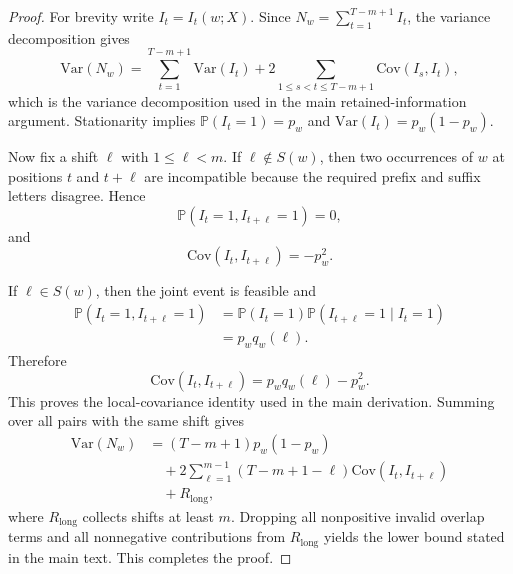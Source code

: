 \documentclass[12pt,letterpaper]{article}
\begin{document}
\begin{proof}
For brevity write $I_t=I_t(w;X)$. Since $N_w=\sum_{t=1}^{T-m+1} I_t$, the variance decomposition gives
\begin{equation}
\mathrm{Var}(N_w)
=
\sum_{t=1}^{T-m+1}\mathrm{Var}(I_t)
+
2\sum_{1\leq s<t\leq T-m+1}\mathrm{Cov}(I_s,I_t),
\label{eq:appvardecomp}
\end{equation}
which is the variance decomposition used in the main retained-information argument. Stationarity implies $\mathbb{P}(I_t=1)=p_w$ and $\mathrm{Var}(I_t)=p_w(1-p_w)$.

Now fix a shift $\ell$ with $1\leq \ell < m$. If $\ell \notin S(w)$, then two occurrences of $w$ at positions $t$ and $t+\ell$ are incompatible because the required prefix and suffix letters disagree. Hence
\begin{equation}
\mathbb{P}(I_t=1,I_{t+\ell}=1)=0,
\label{eq:appinvalid}
\end{equation}
and
\begin{equation}
\mathrm{Cov}(I_t,I_{t+\ell}) = -p_w^2.
\label{eq:appinvalidcov}
\end{equation}

If $\ell \in S(w)$, then the joint event is feasible and
\begin{equation}
\begin{aligned}
\mathbb{P}(I_t=1,I_{t+\ell}=1)
&= \mathbb{P}(I_t=1)\mathbb{P}(I_{t+\ell}=1\mid I_t=1) \\
&= p_w q_w(\ell).
\end{aligned}
\label{eq:appvalid}
\end{equation}
Therefore
\begin{equation}
\mathrm{Cov}(I_t,I_{t+\ell})
=
p_w q_w(\ell)-p_w^2.
\label{eq:appvalidcov}
\end{equation}
This proves the local-covariance identity used in the main derivation. Summing over all pairs with the same shift gives
\begin{equation}
\begin{aligned}
\mathrm{Var}(N_w)
&= (T-m+1)p_w(1-p_w) \\
&\quad + 2\sum_{\ell=1}^{m-1}(T-m+1-\ell)\mathrm{Cov}(I_t,I_{t+\ell}) \\
&\quad + R_{\mathrm{long}},
\end{aligned}
\label{eq:applocalsum}
\end{equation}
where $R_{\mathrm{long}}$ collects shifts at least $m$. Dropping all nonpositive invalid overlap terms and all nonnegative contributions from $R_{\mathrm{long}}$ yields the lower bound stated in the main text. This completes the proof.
\end{proof}
\end{document}
